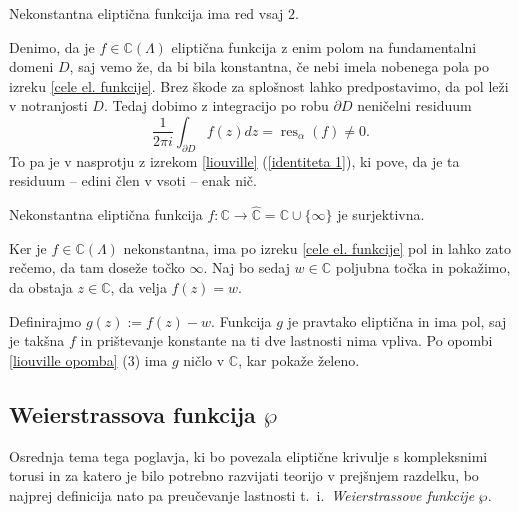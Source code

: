 \documentclass[mat1]{fmfdelo}
\newcommand{\C}{\mathbb C}
\newcommand{\RS}{\widehat{\C}}
\newcommand{\elf}{\C(\Lambda)}
\newcommand{\res}[2]{\operatorname{res}_{#1}(#2)}
\theoremstyle{definition}
\begin{document}
\begin{zgled*}
\end{zgled*}

\begin{posledica}
    \label{poseldica o redu elipticne funkcije}
    Nekonstantna eliptična funkcija ima red vsaj $2$.
\end{posledica}

\begin{dokaz}
    Denimo, da je $f \in \elf$ eliptična funkcija z enim polom na fundamentalni domeni $D$, saj vemo že, da bi bila konstantna, če nebi imela nobenega pola po izreku \ref{cele el. funkcije}. Brez škode za splošnost lahko predpostavimo, da pol leži v notranjosti $D$. Tedaj dobimo z integracijo po robu $\partial D$ neničelni residuum
    \[
        \frac{1}{2 \pi i} \int_{\partial D} f(z)dz = \res{\alpha}{f} \neq 0.  
    \]
    To pa je v nasprotju z izrekom \ref{liouville} (\ref{identiteta 1}), ki pove, da je ta residuum -- edini člen v vsoti -- enak nič. 
\end{dokaz}

\begin{posledica}
    Nekonstantna eliptična funkcija $f: \C \to \RS = \C \cup \{\infty\}$ je surjektivna. 
\end{posledica}

\begin{dokaz}
    Ker je $f \in \elf$ nekonstantna, ima po izreku \ref{cele el. funkcije} pol in lahko zato rečemo, da tam doseže točko $\infty$. Naj bo sedaj $w \in \C$ poljubna točka in pokažimo, da obstaja $z \in \C$, da velja $f(z) = w$.
    
    Definirajmo $g(z) := f(z) - w$. Funkcija $g$ je pravtako eliptična in ima pol, saj je takšna $f$ in prištevanje konstante na ti dve lastnosti nima vpliva. Po opombi \ref{liouville opomba} (3) ima $g$ ničlo v $\C$, kar pokaže želeno.
\end{dokaz}




\subsection{Weierstrassova funkcija $\wp$}

Osrednja tema tega poglavja, ki bo povezala eliptične krivulje s kompleksnimi torusi in za katero je bilo potrebno razvijati teorijo v prejšnjem razdelku, bo najprej definicija nato pa preučevanje lastnosti t.~i.\ \emph{Weierstrassove funkcije} $\wp$. 
\end{document}
